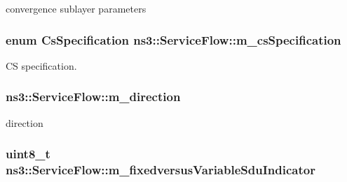 convergence sublayer parameters 

\subsubsection[{\texorpdfstring{m\+\_\+cs\+Specification}{m_csSpecification}}]{\setlength{\rightskip}{0pt plus 5cm}enum {\bf Cs\+Specification} ns3\+::\+Service\+Flow\+::m\+\_\+cs\+Specification\hspace{0.3cm}{\ttfamily [private]}}\hypertarget{classns3_1_1ServiceFlow_a17884a9cb0e15543e8d96f8241b680ae}{}\label{classns3_1_1ServiceFlow_a17884a9cb0e15543e8d96f8241b680ae}


CS specification. 

\subsubsection[{\texorpdfstring{m\+\_\+direction}{m_direction}}]{ ns3\+::\+Service\+Flow\+::m\+\_\+direction\hspace{0.3cm}{\ttfamily [private]}}\hypertarget{classns3_1_1ServiceFlow_aeadd654a7d1e5e6c64b6702fecc289dd}{}\label{classns3_1_1ServiceFlow_aeadd654a7d1e5e6c64b6702fecc289dd}


direction 

\subsubsection[{\texorpdfstring{m\+\_\+fixedversus\+Variable\+Sdu\+Indicator}{m_fixedversusVariableSduIndicator}}]{\setlength{\rightskip}{0pt plus 5cm}uint8\+\_\+t ns3\+::\+Service\+Flow\+::m\+\_\+fixedversus\+Variable\+Sdu\+Indicator\hspace{0.3cm}{\ttfamily [private]}}\hypertarget{classns3_1_1ServiceFlow_abcc372b51b2b646d66af51fb2231a183}{}\label{classns3_1_1ServiceFlow_abcc372b51b2b646d66af51fb2231a183}


